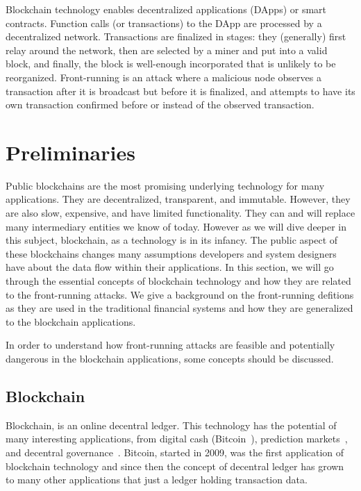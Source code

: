 Blockchain technology enables decentralized applications (DApps) or smart contracts. Function calls (or transactions) to the DApp are processed by a decentralized network. Transactions are finalized in stages: they (generally) first relay around the network, then are selected by a miner and put into a valid block, and finally, the block is well-enough incorporated that is unlikely to be reorganized. Front-running is an attack where a malicious node observes a transaction after it is broadcast but before it is finalized, and attempts to have its own transaction confirmed before or instead of the observed transaction.





\section{Preliminaries}
Public blockchains are the most promising underlying technology for many applications. They are decentralized, transparent, and immutable. However, they are also slow, expensive, and have limited functionality. They can and will replace many intermediary entities we know of today. However as we will dive deeper in this subject, blockchain, as a technology is in its infancy. The public aspect of these blockchains changes many assumptions developers and system designers have about the data flow within their applications. In this section, we will go through the essential concepts of blockchain technology and how they are related to the front-running attacks. We give a background on the front-running defitions as they are used in the traditional financial systems and how they are generalized to the blockchain applications. 


In order to understand how front-running attacks are feasible and potentially dangerous in the blockchain applications, some concepts should be discussed.  

\subsection{Blockchain}
Blockchain, is an online decentral ledger. This technology has the potential of many interesting applications, from digital cash (\eg Bitcoin~\cite{nakamoto2008bitcoin}), prediction markets~\cite{clark2014decentralizing}, and decentral governance~\cite{aragonwebsite}. Bitcoin, started in 2009, was the first application of blockchain technology and since then the concept of decentral ledger has grown to many other applications that just a ledger holding transaction data. 

